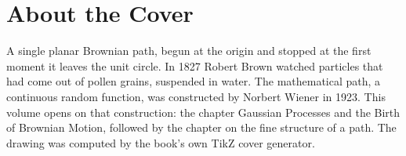 \backmatter
\cleardoublepage
\chapter*{About the Cover}
\noindent A single planar Brownian path, begun at the origin and stopped at the first moment it leaves the unit circle. In 1827 Robert Brown watched particles that had come out of pollen grains, suspended in water. The mathematical path, a continuous random function, was constructed by Norbert Wiener in 1923. This volume opens on that construction: the chapter Gaussian Processes and the Birth of Brownian Motion, followed by the chapter on the fine structure of a path. The drawing was computed by the book's own TikZ cover generator.
